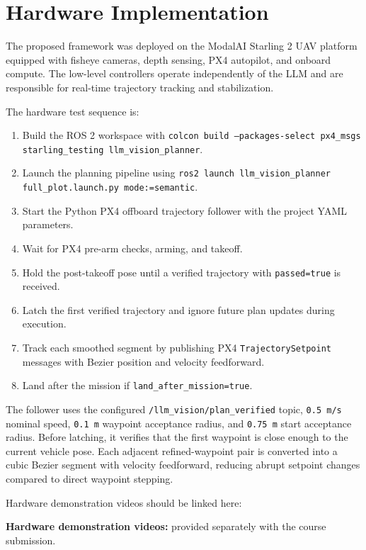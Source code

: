 \documentclass[11pt]{article}
\begin{document}
\section{Hardware Implementation}

The proposed framework was deployed on the ModalAI Starling 2 UAV platform equipped with fisheye cameras, depth sensing, PX4 autopilot, and onboard compute. The low-level controllers operate independently of the LLM and are responsible for real-time trajectory tracking and stabilization.

The hardware test sequence is:

\begin{enumerate}
  \item Build the ROS 2 workspace with \texttt{colcon build --packages-select px4\_msgs starling\_testing llm\_vision\_planner}.
  \item Launch the planning pipeline using \texttt{ros2 launch llm\_vision\_planner full\_plot.launch.py mode:=semantic}.
  \item Start the Python PX4 offboard trajectory follower with the project YAML parameters.
  \item Wait for PX4 pre-arm checks, arming, and takeoff.
  \item Hold the post-takeoff pose until a verified trajectory with \texttt{passed=true} is received.
  \item Latch the first verified trajectory and ignore future plan updates during execution.
  \item Track each smoothed segment by publishing PX4 \texttt{TrajectorySetpoint} messages with Bezier position and velocity feedforward.
  \item Land after the mission if \texttt{land\_after\_mission=true}.
\end{enumerate}

The follower uses the configured \texttt{/llm\_vision/plan\_verified} topic, \texttt{0.5 m/s} nominal speed, \texttt{0.1 m} waypoint acceptance radius, and \texttt{0.75 m} start acceptance radius. Before latching, it verifies that the first waypoint is close enough to the current vehicle pose. Each adjacent refined-waypoint pair is converted into a cubic Bezier segment with velocity feedforward, reducing abrupt setpoint changes compared to direct waypoint stepping.

Hardware demonstration videos should be linked here:

\begin{center}
\textbf{Hardware demonstration videos:} provided separately with the course submission.
\end{center}
\end{document}
